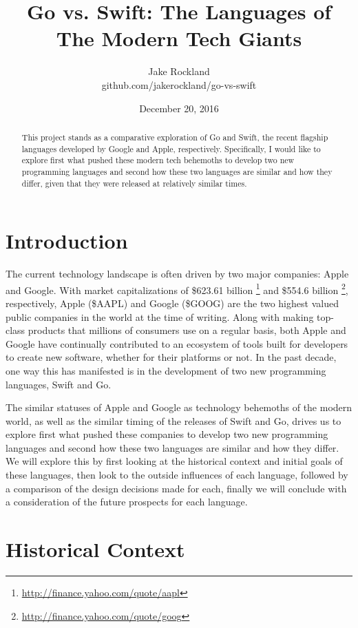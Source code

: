 \documentclass[letterpaper]{article}
\title{Go vs. Swift: The Languages of The Modern Tech Giants}
\author{Jake Rockland \\ github.com/jakerockland/go-vs-swift}
\date{December 20, 2016}
\begin{document}
\begin{titlepage}
\maketitle
\end{titlepage}

\begin{abstract}
This project stands as a comparative exploration of Go and Swift, the recent flagship languages developed by Google and Apple, respectively. Specifically, I would like to explore first what pushed these modern tech behemoths to develop two new programming languages and second how these two languages are similar and how they differ, given that they were released at relatively similar times.
\end{abstract}

\section{Introduction}

The current technology landscape is often driven by two major companies: Apple and Google. With market capitalizations of \$623.61 billion \footnote{\url{http://finance.yahoo.com/quote/aapl}} and \$554.6 billion \footnote{\url{http://finance.yahoo.com/quote/goog}}, respectively, Apple (\$AAPL) and Google (\$GOOG) are the two highest valued public companies in the world at the time of writing. Along with making top-class products that millions of consumers use on a regular basis, both Apple and Google have continually contributed to an ecosystem of tools built for developers to create new software, whether for their platforms or not. In the past decade, one way this has manifested is in the development of two new programming languages, Swift and Go.

The similar statuses of Apple and Google as technology behemoths of the modern world, as well as the similar timing of the releases of Swift and Go, drives us to explore first what pushed these companies to develop two new programming languages and second how these two languages are similar and how they differ. We will explore this by first looking at the historical context and initial goals of these languages, then look to the outside influences of each language, followed by a comparison of the design decisions made for each, finally we will conclude with a consideration of the future prospects for each language.

\section{Historical Context}
\end{document}
